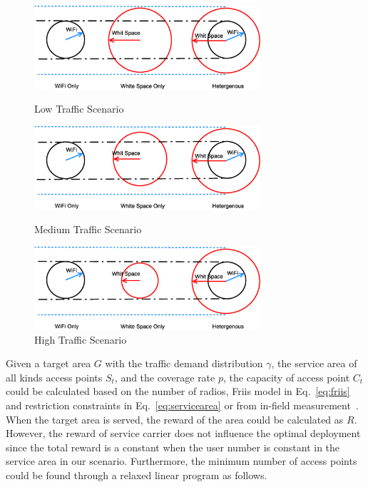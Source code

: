 \begin{figure}
\centering
\includegraphics[width=84mm]{figures/lowtraffic}
\vspace{-0.1in}
\caption{Low Traffic Scenario}                                                                 
\label{fig:lowtraffic}

\includegraphics[width=84mm]{figures/mediumtraffic}
\vspace{-0.1in}
\caption{Medium Traffic Scenario}                                                                 
\label{fig:mediumtraffic}


\includegraphics[width=84mm]{figures/hightraffic}
\vspace{-0.1in}
\caption{High Traffic Scenario}                                                                 
\label{fig:hightraffic}
\vspace{-0.1in}
\end{figure}

Given a target area $G$ with the traffic demand distribution $\gamma$, the service area 
of all kinds access points $S_t$, and the coverage rate $p$, the capacity of access point $C_t$ could 
be calculated based on the number of radios, Friis model in Eq.~\ref{eq:friis} and restriction constraints in Eq.~\ref{eq:servicearea}
or from in-field measurement~\cite{cuileveraging}. 
When the target area is served, the reward of the area 
could be calculated as $R$. However, the reward of service carrier does not influence the 
optimal deployment since the total reward is a constant when the user number is constant in the 
service area in our scenario. Furthermore, the minimum number of access points could be found through 
a relaxed linear program as follows. 

